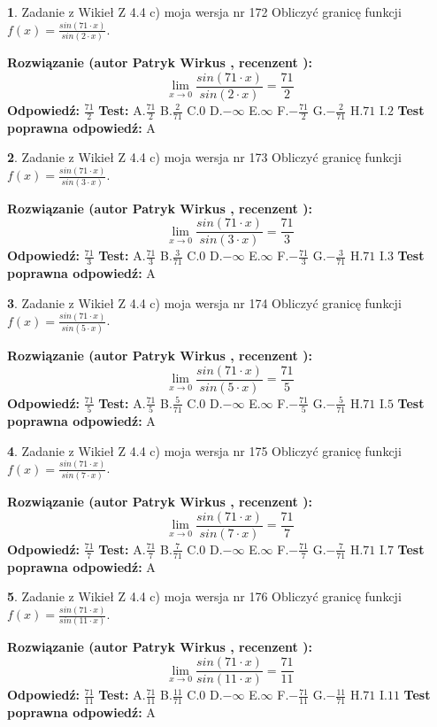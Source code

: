 \documentclass[12pt, a4paper]{article}
\theoremstyle{definition} %
\newtheorem{zad}{}
\newcommand{\zadStart}[1]{\begin{zad}#1\newline}
\newcommand{\zadStop}{\end{zad}}
\newcommand{\rozwStart}[2]{\noindent \textbf{Rozwiązanie (autor #1 , recenzent #2): }\newline}
\newcommand{\rozwStop}{\newline}
\newcommand{\odpStart}{\noindent \textbf{Odpowiedź:}\newline}
\newcommand{\odpStop}{\newline}
\newcommand{\testStart}{\noindent \textbf{Test:}\newline}
\newcommand{\testStop}{\newline}
\newcommand{\kluczStart}{\noindent \textbf{Test poprawna odpowiedź:}\newline}
\newcommand{\kluczStop}{\newline}
\begin{document}
\zadStart{Zadanie z Wikieł Z 4.4 c) moja wersja nr 172}
Obliczyć granicę funkcji $f(x)=\frac{sin(71\cdot x)}{sin(2\cdot x)}$.
\zadStop
\rozwStart{Patryk Wirkus}{}
$$\lim\limits_{x\to 0}\frac{sin(71\cdot x)}{sin(2\cdot x)}=
\frac{71}{2}$$
\rozwStop
\odpStart
$\frac{71}{2}$
\odpStop
\testStart
A.$\frac{71}{2}$
B.$\frac{2}{71}$
C.$0$
D.$-\infty$
E.$\infty$
F.$-\frac{71}{2}$
G.$-\frac{2}{71}$
H.$71$
I.$2$
\testStop
\kluczStart
A
\kluczStop



\zadStart{Zadanie z Wikieł Z 4.4 c) moja wersja nr 173}
Obliczyć granicę funkcji $f(x)=\frac{sin(71\cdot x)}{sin(3\cdot x)}$.
\zadStop
\rozwStart{Patryk Wirkus}{}
$$\lim\limits_{x\to 0}\frac{sin(71\cdot x)}{sin(3\cdot x)}=
\frac{71}{3}$$
\rozwStop
\odpStart
$\frac{71}{3}$
\odpStop
\testStart
A.$\frac{71}{3}$
B.$\frac{3}{71}$
C.$0$
D.$-\infty$
E.$\infty$
F.$-\frac{71}{3}$
G.$-\frac{3}{71}$
H.$71$
I.$3$
\testStop
\kluczStart
A
\kluczStop



\zadStart{Zadanie z Wikieł Z 4.4 c) moja wersja nr 174}
Obliczyć granicę funkcji $f(x)=\frac{sin(71\cdot x)}{sin(5\cdot x)}$.
\zadStop
\rozwStart{Patryk Wirkus}{}
$$\lim\limits_{x\to 0}\frac{sin(71\cdot x)}{sin(5\cdot x)}=
\frac{71}{5}$$
\rozwStop
\odpStart
$\frac{71}{5}$
\odpStop
\testStart
A.$\frac{71}{5}$
B.$\frac{5}{71}$
C.$0$
D.$-\infty$
E.$\infty$
F.$-\frac{71}{5}$
G.$-\frac{5}{71}$
H.$71$
I.$5$
\testStop
\kluczStart
A
\kluczStop



\zadStart{Zadanie z Wikieł Z 4.4 c) moja wersja nr 175}
Obliczyć granicę funkcji $f(x)=\frac{sin(71\cdot x)}{sin(7\cdot x)}$.
\zadStop
\rozwStart{Patryk Wirkus}{}
$$\lim\limits_{x\to 0}\frac{sin(71\cdot x)}{sin(7\cdot x)}=
\frac{71}{7}$$
\rozwStop
\odpStart
$\frac{71}{7}$
\odpStop
\testStart
A.$\frac{71}{7}$
B.$\frac{7}{71}$
C.$0$
D.$-\infty$
E.$\infty$
F.$-\frac{71}{7}$
G.$-\frac{7}{71}$
H.$71$
I.$7$
\testStop
\kluczStart
A
\kluczStop



\zadStart{Zadanie z Wikieł Z 4.4 c) moja wersja nr 176}
Obliczyć granicę funkcji $f(x)=\frac{sin(71\cdot x)}{sin(11\cdot x)}$.
\zadStop
\rozwStart{Patryk Wirkus}{}
$$\lim\limits_{x\to 0}\frac{sin(71\cdot x)}{sin(11\cdot x)}=
\frac{71}{11}$$
\rozwStop
\odpStart
$\frac{71}{11}$
\odpStop
\testStart
A.$\frac{71}{11}$
B.$\frac{11}{71}$
C.$0$
D.$-\infty$
E.$\infty$
F.$-\frac{71}{11}$
G.$-\frac{11}{71}$
H.$71$
I.$11$
\testStop
\kluczStart
A
\kluczStop
\end{document}
